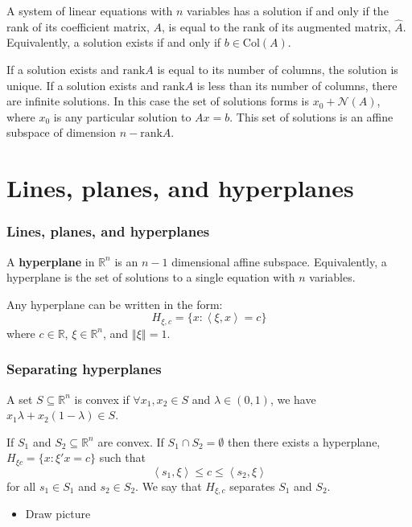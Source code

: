 \documentclass[compress]{beamer}
\def\R{\mathbb{R}}
\newcommand{\iprod}[2]{\left\langle {#1} , {#2} \right\rangle}
\newcommand{\norm}[1]{\left\Vert {#1} \right\Vert}
\newcommand{\rank}{\mathrm{rank}}
\newcommand{\col}{\mathrm{Col}}
\begin{document}
\begin{frame}
  \begin{theorem} \label{thm:rc} A system of linear
    equations with $n$ variables has a solution if and only if the rank
    of its coefficient matrix, $A$, is equal to the rank of its
    augmented matrix, $\hat{A}$. Equivalently, a solution exists if and
    only if $b \in \col(A)$.
    
    If a solution exists and $\rank A$ is equal to its number of
    columns, the solution is unique. If a solution exists and $\rank A$
    is less than its number of columns, there are infinite solutions. In
    this case the set of solutions forms is $x_0 + \mathcal{N}(A)$,
    where $x_0$ is any particular solution to $A x = b$. This set of
    solutions is an affine subspace of dimension $n - \rank A$.
  \end{theorem}
\end{frame}

\section{Lines, planes, and hyperplanes }

\begin{frame}
  \frametitle{Lines, planes, and hyperplanes}
  \begin{definition}
    A \textbf{hyperplane} in $\R^n$ is an $n-1$ dimensional affine
    subspace. Equivalently, a hyperplane is the set of solutions to a
    single equation with $n$ variables.
  \end{definition}
  Any hyperplane can be written in the form:
  \[ H_{\xi,c} = \{x: \iprod{\xi}{x} = c \} \] where $c \in \R$, $\xi \in
  \R^n$, and $\norm{\xi} = 1$.
\end{frame}

\begin{frame}
  \frametitle{Separating hyperplanes}
  \begin{definition}
    A set $S \subseteq \R^n$ is convex if $\forall x_1, x_2 \in S$ and
    $\lambda \in (0,1)$, we have $x_1 \lambda + x_2(1-\lambda) \in S$.  
  \end{definition}
  \begin{theorem}
    If $S_1$ and $S_2 \subseteq \R^n$ are convex. If $S_1 \cap S_2 =
    \emptyset$ then there exists a hyperplane, $H_{\xi c} = \{ x:
    \xi'x = c \}$ such that
    \[ \iprod{s_1}{\xi} \leq c \leq \iprod{s_2}{\xi} \]
    for all $s_1 \in S_1$ and $s_2 \in S_2$. We say that $H_{\xi,c}$
    separates $S_1$ and $S_2$. 
  \end{theorem}
  \begin{itemize}
  \item Draw picture
  \end{itemize}
\end{frame}
\end{document}
